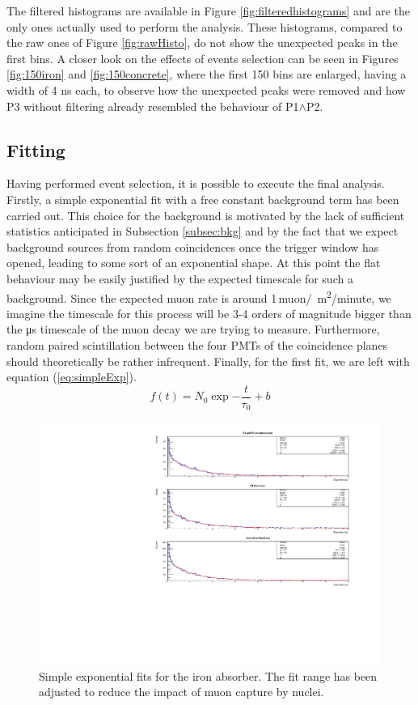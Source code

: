 \documentclass[../main.tex]{subfiles}
\begin{document}
The filtered histograms are available in Figure \ref{fig:filteredhistograms} and are the only ones actually used to perform the analysis. These histograms, compared to the raw ones of Figure \ref{fig:rawHisto}, do not show the unexpected peaks in the first bins. A closer look on the effects of events selection can be seen in Figures \ref{fig:150iron} and \ref{fig:150concrete}, where the first 150 bins are enlarged, having a width of 4 ns each, to observe how the unexpected peaks were removed and how P3 without filtering already resembled the behaviour of P1$\land$P2.

\subsection{Fitting}
\label{subsec:fitting}

Having performed event selection, it is possible to execute the final analysis. Firstly, a simple exponential fit with a free constant background term has been carried out. This choice for the background is motivated by the lack of sufficient statistics anticipated in Subsection \ref{subsec:bkg} and by the fact that we expect background sources from random coincidences once the trigger window has opened, leading to some sort of an exponential shape. At this point the flat behaviour may be easily justified by the expected timescale for such a background. Since the expected muon rate is around 1\,muon/\si{\centi \square \metre }/minute, we imagine the timescale for this process will be 3-4 orders of magnitude bigger than the \si{\micro \second} timescale of the muon decay we are trying to measure. Furthermore, random paired scintillation between the four PMTs of the coincidence planes should theoretically be rather infrequent. Finally, for the first fit, we are left with equation (\ref{eq:simpleExp}).
\begin{equation}
    f(t)=N_0 \exp{-\frac{t}{\tau_0}}+b
    \label{eq:simpleExp}
\end{equation}

\begin{figure}[htb!]
    \centering
    \includegraphics[width=0.9\linewidth]{images/iron_filtered_fit.pdf}
    \caption{Simple exponential fits for the iron absorber. The fit range has been adjusted to reduce the impact of muon capture by nuclei.}
    \label{fig:ironFits}
\end{figure}
\end{document}
